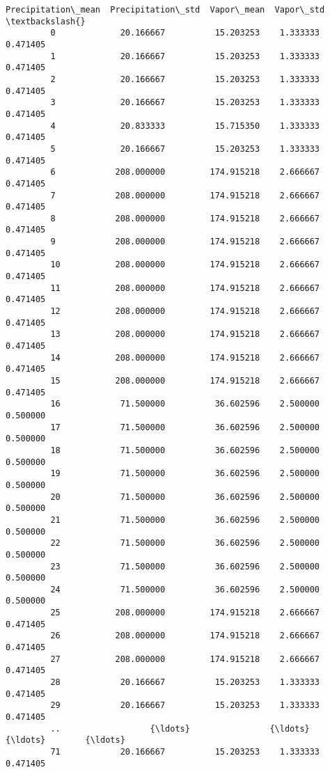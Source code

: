 \documentclass[11pt]{article}
\begin{document}
\begin{Verbatim}[commandchars=\\\{\}]
              Precipitation\_mean  Precipitation\_std  Vapor\_mean  Vapor\_std  \textbackslash{}
         0             20.166667          15.203253    1.333333   0.471405   
         1             20.166667          15.203253    1.333333   0.471405   
         2             20.166667          15.203253    1.333333   0.471405   
         3             20.166667          15.203253    1.333333   0.471405   
         4             20.833333          15.715350    1.333333   0.471405   
         5             20.166667          15.203253    1.333333   0.471405   
         6            208.000000         174.915218    2.666667   0.471405   
         7            208.000000         174.915218    2.666667   0.471405   
         8            208.000000         174.915218    2.666667   0.471405   
         9            208.000000         174.915218    2.666667   0.471405   
         10           208.000000         174.915218    2.666667   0.471405   
         11           208.000000         174.915218    2.666667   0.471405   
         12           208.000000         174.915218    2.666667   0.471405   
         13           208.000000         174.915218    2.666667   0.471405   
         14           208.000000         174.915218    2.666667   0.471405   
         15           208.000000         174.915218    2.666667   0.471405   
         16            71.500000          36.602596    2.500000   0.500000   
         17            71.500000          36.602596    2.500000   0.500000   
         18            71.500000          36.602596    2.500000   0.500000   
         19            71.500000          36.602596    2.500000   0.500000   
         20            71.500000          36.602596    2.500000   0.500000   
         21            71.500000          36.602596    2.500000   0.500000   
         22            71.500000          36.602596    2.500000   0.500000   
         23            71.500000          36.602596    2.500000   0.500000   
         24            71.500000          36.602596    2.500000   0.500000   
         25           208.000000         174.915218    2.666667   0.471405   
         26           208.000000         174.915218    2.666667   0.471405   
         27           208.000000         174.915218    2.666667   0.471405   
         28            20.166667          15.203253    1.333333   0.471405   
         29            20.166667          15.203253    1.333333   0.471405   
         ..                  {\ldots}                {\ldots}         {\ldots}        {\ldots}   
         71            20.166667          15.203253    1.333333   0.471405   

\end{Verbatim}
\end{document}
